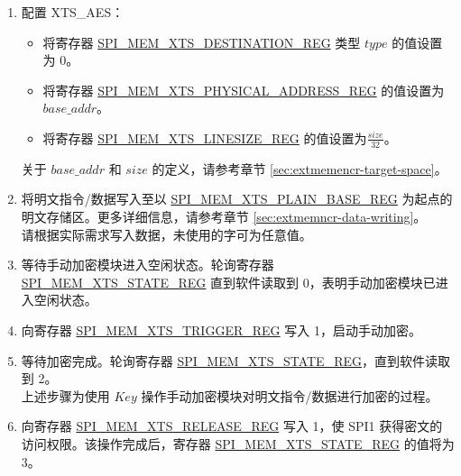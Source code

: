 \documentclass[main\_\_CN.tex]{subfiles}
\begin{document}
\begin{enumerate}

    \item 配置 XTS\_AES：
    \begin{itemize}
        \item 将寄存器 \hyperref[regdesc:SPIMEMXTSDESTINATIONREG]{SPI\_MEM\_XTS\_DESTINATION\_REG} 类型 \begin{math}type\end{math} 的值设置为 0。
        \item 将寄存器 \hyperref[regdesc:SPIMEMXTSPHYSICALADDRESSREG]{SPI\_MEM\_XTS\_PHYSICAL\_ADDRESS\_REG} 的值设置为 \begin{math}base\_addr\end{math}。
        \item 将寄存器 \hyperref[regdesc:SPIMEMXTSLINESIZEREG]{SPI\_MEM\_XTS\_LINESIZE\_REG} 的值设置为\begin{math}\frac{size}{32}\end{math}。
    \end{itemize}
    关于 \begin{math} base\_addr\end{math} 和 \begin{math}size\end{math} 的定义，请参考章节 \ref{sec:extmemencr-target-space}。
    \item 将明文指令/数据写入至以 \hyperref[regdesc:SPIMEMXTSPLAINBASEREG]{SPI\_MEM\_XTS\_PLAIN\_BASE\_REG} 为起点的明文存储区。更多详细信息，请参考章节 \ref{sec:extmemncr-data-writing}。\\请根据实际需求写入数据，未使用的字可为任意值。

    \item 等待手动加密模块进入空闲状态。轮询寄存器 \hyperref[regdesc:SPIMEMXTSSTATEREG]{SPI\_MEM\_XTS\_STATE\_REG} 直到软件读取到 0，表明手动加密模块已进入空闲状态。

    \item 向寄存器 \hyperref[regdesc:SPIMEMXTSTRIGGERREG]{SPI\_MEM\_XTS\_TRIGGER\_REG} 写入 1，启动手动加密。

    \item 等待加密完成。轮询寄存器 \hyperref[regdesc:SPIMEMXTSSTATEREG]{SPI\_MEM\_XTS\_STATE\_REG}，直到软件读取到 2。\\
    上述步骤为使用 \begin{math}\mathit{Key}\end{math} 操作手动加密模块对明文指令/数据进行加密的过程。

    \item 向寄存器 \hyperref[regdesc:SPIMEMXTSRELEASEREG]{SPI\_MEM\_XTS\_RELEASE\_REG} 写入 1，使 SPI1 获得密文的访问权限。该操作完成后，寄存器 \hyperref[regdesc:SPIMEMXTSSTATEREG]{SPI\_MEM\_XTS\_STATE\_REG} 的值将为 3。


\end{enumerate}
\end{document}
